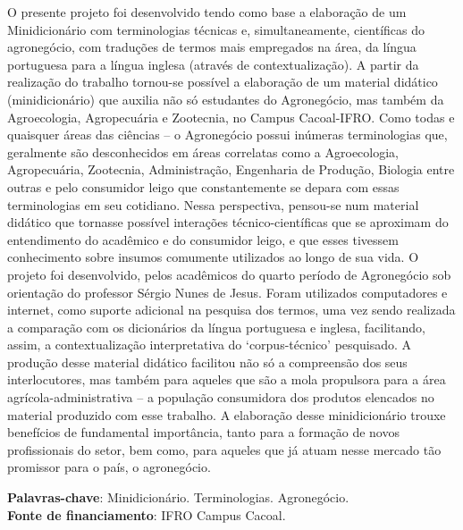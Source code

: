 \documentclass[article,12pt,onesidea,4paper,english,brazil]{abntex2}
\begin{document}
	\noindent O presente projeto foi desenvolvido tendo como base a elaboração de um
	Minidicionário com terminologias técnicas e, simultaneamente, científicas do
	agronegócio, com traduções de termos mais empregados na área, da língua
	portuguesa para a língua inglesa (através de contextualização). A partir da
	realização do trabalho tornou-se possível a elaboração de um material didático
	(minidicionário) que auxilia não só estudantes do Agronegócio, mas também da
	Agroecologia, Agropecuária e Zootecnia, no Campus Cacoal-IFRO. Como todas e
	quaisquer áreas das ciências – o Agronegócio possui inúmeras terminologias que,
	geralmente são desconhecidos em áreas correlatas como a Agroecologia,
	Agropecuária, Zootecnia, Administração, Engenharia de Produção, Biologia entre
	outras e pelo consumidor leigo que constantemente se depara com essas
	terminologias em seu cotidiano. Nessa perspectiva, pensou-se num material didático
	que tornasse possível interações técnico-científicas que se aproximam do
	entendimento do acadêmico e do consumidor leigo, e que esses tivessem
	conhecimento sobre insumos comumente utilizados ao longo de sua vida. O projeto
	foi desenvolvido, pelos acadêmicos do quarto período de Agronegócio sob
	orientação do professor Sérgio Nunes de Jesus. Foram utilizados computadores e
	internet, como suporte adicional na pesquisa dos termos, uma vez sendo realizada a
	comparação com os dicionários da língua portuguesa e inglesa, facilitando, assim, a
	contextualização interpretativa do ‘corpus-técnico’ pesquisado. A produção desse
	material didático facilitou não só a compreensão dos seus interlocutores, mas
	também para aqueles que são a mola propulsora para a área agrícola-administrativa
	– a população consumidora dos produtos elencados no material produzido com esse
	trabalho. A elaboração desse minidicionário trouxe benefícios de fundamental
	importância, tanto para a formação de novos profissionais do setor, bem como, para
	aqueles que já atuam nesse mercado tão promissor para o país, o agronegócio.
	
	\vspace{\onelineskip}
	
	\noindent
	\textbf{Palavras-chave}: Minidicionário. Terminologias. Agronegócio. \\
	\textbf{Fonte de financiamento}: IFRO Campus Cacoal. 
	
\end{document}

